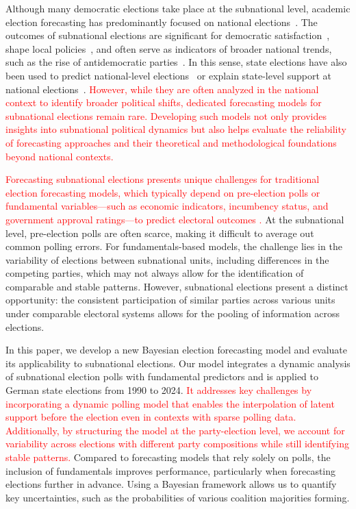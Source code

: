 \documentclass[12pt]{article}
\begin{document}
\begin{doublespacing}


Although many democratic elections take place at the subnational level, academic election forecasting has predominantly focused on national elections~\citep[see e.g.][]{lewis2005election,stegmaier2022forecasting,stegmaier2023evolution}. The outcomes of subnational elections are significant for democratic satisfaction~\citep{singh2012differentiating}, shape local policies~\citep{alt2000dynamic,uppal2011does}, and often serve as indicators of broader national trends, such as the rise of antidemocratic parties~\citep{arzheimer2019don}. In this sense, state elections have also been used to predict national-level elections~\citep{kayser2017lander} or explain state-level support at national elections~\citep{erikson2015gubernatorial}. \textcolor{red}{However, while they are often analyzed in the national context to identify broader political shifts, dedicated forecasting models for subnational elections remain rare. Developing such models not only provides insights into subnational political dynamics but also helps evaluate the reliability of forecasting approaches and their theoretical and methodological foundations beyond national contexts.}

\textcolor{red}{Forecasting subnational elections presents unique challenges for traditional election forecasting models, which typically depend on pre-election polls or fundamental variables—such as economic indicators, incumbency status, and government approval ratings—to predict electoral outcomes \citep{lewis2015forecasting,nadeau2020election}.} At the subnational level, pre-election polls are often scarce, making it difficult to average out common polling errors. For fundamentals-based models, the challenge lies in the variability of elections between subnational units, including differences in the competing parties, which may not always allow for the identification of comparable and stable patterns. However, subnational elections present a distinct opportunity: the consistent participation of similar parties across various units under comparable electoral systems allows for the pooling of information across elections.

In this paper, we develop a new Bayesian election forecasting model and evaluate its applicability to subnational elections. Our model integrates a dynamic analysis of subnational election polls with fundamental predictors and is applied to German state elections from 1990 to 2024. \textcolor{red}{It addresses key challenges by incorporating a dynamic polling model that enables the interpolation of latent support before the election even in contexts with sparse polling data. Additionally, by structuring the model at the party-election level, we account for variability across elections with different party compositions while still identifying stable patterns.} Compared to forecasting models that rely solely on polls, the inclusion of fundamentals improves performance, particularly when forecasting elections further in advance. Using a Bayesian framework allows us to quantify key uncertainties, such as the probabilities of various coalition majorities forming.


\end{doublespacing}
\end{document}
